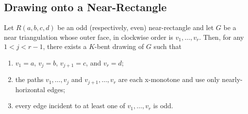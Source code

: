 \documentclass{patmorin}
\begin{document}
\subsection{Drawing onto a Near-Rectangle}


\begin{lem}
   Let $R(a,b,c,d)$ be an odd (respectively, even) near-rectangle and
   let $G$ be a near triangulation whose outer face, in clockwise order
   is $v_1,\ldots,v_r$.  Then, for any $1<j<r-1$, there exists a $K$-bent
   drawing of $G$ such that
\begin{enumerate}
   \item $v_1=a$, $v_j=b$, $v_{j+1}=c$, and $v_r=d$;
   \item the paths $v_1,\ldots,v_j$ and $v_{j+1},\ldots,v_r$ are each x-monotone and use only nearly-horizontal edges;
   \item every edge incident to at least one of $v_1,\ldots,v_r$ is odd.
\end{enumerate}
\end{lem}
\end{document}
